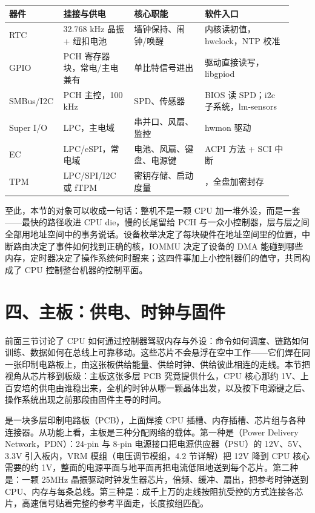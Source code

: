 \begin{longtable}{L{0.15\linewidth}L{0.24\linewidth}L{0.24\linewidth}L{0.30\linewidth}}
\toprule
器件 & 挂接与供电 & 核心职能 & 软件入口 \\
\midrule
RTC & 32.768 kHz 晶振 + 纽扣电池 & 墙钟保持、闹钟/唤醒 & 内核读初值，hwclock，NTP 校准 \\
GPIO & PCH 寄存器块，常电/主电兼有 & 单比特信号进出 & 驱动直接读写，libgpiod \\
SMBus/I2C & PCH 主控，100 kHz & SPD、传感器 & BIOS 读 SPD；i2c 子系统，lm-sensors \\
Super I/O & LPC，主电域 & 串并口、风扇、监控 & hwmon 驱动 \\
EC & LPC/eSPI，常电域 & 电池、风扇、键盘、电源键 & ACPI 方法 + SCI 中断 \\
TPM & LPC/SPI/I2C 或 fTPM & 密钥存储、启动度量 & ，全盘加密封存 \\
\bottomrule
\end{longtable}

至此，本节的对象可以收成一句话：整机不是一颗 CPU 加一堆外设，而是一套——最快的路径收进 CPU die，慢的长尾留给 PCH 与一众小控制器，层与层之间全部用地址空间中的事务说话。设备枚举决定了每块硬件在地址空间里的位置，中断路由决定了事件如何找到正确的核，IOMMU 决定了设备的 DMA 能碰到哪些内存，定时器决定了操作系统何时醒来；这四件事加上小控制器们的值守，共同构成了 CPU 控制整台机器的控制平面。

\section{四、主板：供电、时钟与固件}

前面三节讨论了 CPU 如何通过控制器驾驭内存与外设：命令如何调度、链路如何训练、数据如何在总线上可靠移动。这些芯片不会悬浮在空中工作——它们焊在同一张印制电路板上，由这张板供给能量、供给时钟、供给彼此相连的走线。本节把视角从芯片移到板级：主板这张多层 PCB 究竟提供什么，CPU 核心那约 1V、上百安培的供电由谁稳出来，全机的时钟从哪一颗晶体出发，以及按下电源键之后、操作系统出现之前那段由固件主导的时间。


是一块多层印制电路板（PCB），上面焊接 CPU 插槽、内存插槽、芯片组与各种连接器。从功能上看，主板是三种分配网络的载体。第一种是（Power Delivery Network，PDN）：24-pin 与 8-pin 电源接口把电源供应器（PSU）的 12V、5V、3.3V 引入板内，VRM 模组（电压调节模组，4.2 节详解）把 12V 降到 CPU 核心需要的约 1V，整面的电源平面与地平面再把电流低阻地送到每个芯片。第二种是：一颗 25MHz 晶振驱动时钟发生器芯片，倍频、缓冲、扇出，把参考时钟送到 CPU、内存与每条总线。第三种是：成千上万的走线按阻抗受控的方式连接各芯片，高速信号贴着完整的参考平面走，长度按组匹配。

